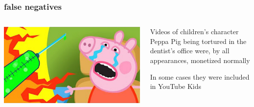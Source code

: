 \documentclass[presentation]{subfiles}
\begin{document}
\begin{frame}\frametitle{false negatives}
  

\begin{columns}
\begin{column}{0.6\textwidth}
\includegraphics[width=\textwidth]{figures/yt_fail/peppa.jpg}
\end{column}
\begin{column}{0.3\textwidth}
Videos of children's character Peppa Pig being tortured in the dentist's office were, by all appearances, monetized normally

\vspace{1em}

In some cases they were included in YouTube Kids
\end{column}

\end{columns}

\end{frame}
\end{document}
